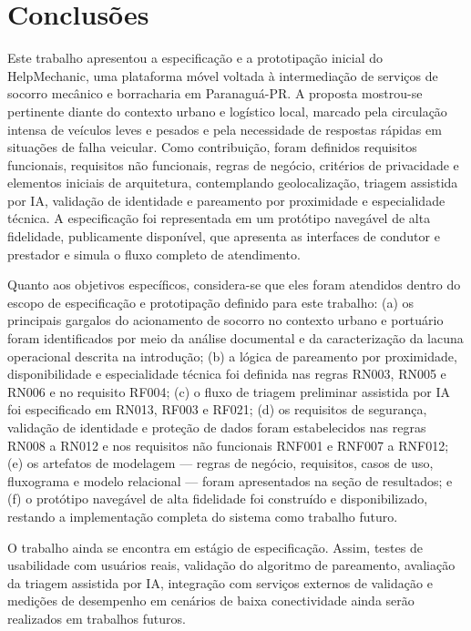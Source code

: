 \documentclass[12pt, a4paper]{article}
\begin{document}
\FloatBarrier


\section{Conclusões}
Este trabalho apresentou a especificação e a prototipação inicial do HelpMechanic, uma plataforma móvel voltada à intermediação de serviços de socorro mecânico e borracharia em Paranaguá-PR. A proposta mostrou-se pertinente diante do contexto urbano e logístico local, marcado pela circulação intensa de veículos leves e pesados e pela necessidade de respostas rápidas em situações de falha veicular. Como contribuição, foram definidos requisitos funcionais, requisitos não funcionais, regras de negócio, critérios de privacidade e elementos iniciais de arquitetura, contemplando geolocalização, triagem assistida por IA, validação de identidade e pareamento por proximidade e especialidade técnica. A especificação foi representada em um protótipo navegável de alta fidelidade, publicamente disponível, que apresenta as interfaces de condutor e prestador e simula o fluxo completo de atendimento.

Quanto aos objetivos específicos, considera-se que eles foram atendidos dentro do escopo de especificação e prototipação definido para este trabalho: (a) os principais gargalos do acionamento de socorro no contexto urbano e portuário foram identificados por meio da análise documental e da caracterização da lacuna operacional descrita na introdução; (b) a lógica de pareamento por proximidade, disponibilidade e especialidade técnica foi definida nas regras RN003, RN005 e RN006 e no requisito RF004; (c) o fluxo de triagem preliminar assistida por IA foi especificado em RN013, RF003 e RF021; (d) os requisitos de segurança, validação de identidade e proteção de dados foram estabelecidos nas regras RN008 a RN012 e nos requisitos não funcionais RNF001 e RNF007 a RNF012; (e) os artefatos de modelagem --- regras de negócio, requisitos, casos de uso, fluxograma e modelo relacional --- foram apresentados na seção de resultados; e (f) o protótipo navegável de alta fidelidade foi construído e disponibilizado, restando a implementação completa do sistema como trabalho futuro.

O trabalho ainda se encontra em estágio de especificação. Assim, testes de usabilidade com usuários reais, validação do algoritmo de pareamento, avaliação da triagem assistida por IA, integração com serviços externos de validação e medições de desempenho em cenários de baixa conectividade ainda serão realizados em trabalhos futuros.
\end{document}
